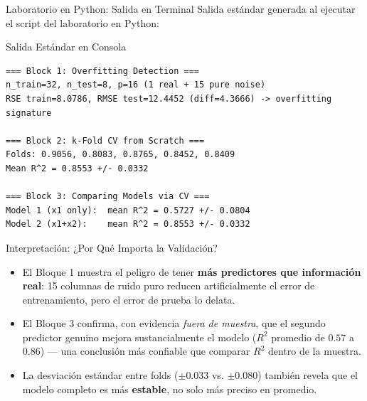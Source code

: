 \documentclass[10pt, aspectratio=169]{beamer}
\begin{document}
\begin{frame}[fragile]{Laboratorio en Python: Salida en Terminal}
  \scriptsize
  Salida estándar generada al ejecutar el script del laboratorio en Python:
  \vspace{0.02cm}
  \begin{block}{Salida Estándar en Consola}
    \fontsize{3.4pt}{4.1pt}\selectfont
    \begin{verbatim}
=== Block 1: Overfitting Detection ===
n_train=32, n_test=8, p=16 (1 real + 15 pure noise)
RSE train=8.0786, RMSE test=12.4452 (diff=4.3666) -> overfitting signature

=== Block 2: k-Fold CV from Scratch ===
Folds: 0.9056, 0.8083, 0.8765, 0.8452, 0.8409
Mean R^2 = 0.8553 +/- 0.0332

=== Block 3: Comparing Models via CV ===
Model 1 (x1 only):  mean R^2 = 0.5727 +/- 0.0804
Model 2 (x1+x2):    mean R^2 = 0.8553 +/- 0.0332
    \end{verbatim}
  \end{block}
\end{frame}

\begin{frame}{Interpretación: ¿Por Qué Importa la Validación?}
  \footnotesize
  \begin{itemize}\itemsep=0.12cm
    \item El Bloque 1 muestra el peligro de tener \textbf{más predictores que información real}: 15 columnas de ruido puro reducen artificialmente el error de entrenamiento, pero el error de prueba lo delata. \pause
    \item El Bloque 3 confirma, con evidencia \emph{fuera de muestra}, que el segundo predictor genuino mejora sustancialmente el modelo ($R^2$ promedio de $0.57$ a $0.86$) --- una conclusión más confiable que comparar $R^2$ dentro de la muestra. \pause
    \item La desviación estándar entre folds ($\pm0.033$ vs. $\pm0.080$) también revela que el modelo completo es más \textbf{estable}, no solo más preciso en promedio.
  \end{itemize}
\end{frame}
\end{document}
